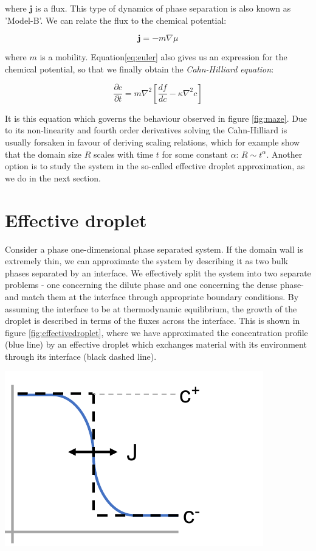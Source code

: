 \documentclass{Dissertate}
\let\origfigure\figure
\let\endorigfigure\endfigure
\renewenvironment{figure}[1][2] {
    \expandafter\origfigure\expandafter[H]
} {
    \endorigfigure
}
\begin{document}
where \(\mathbf{j}\) is a flux. This type of dynamics of phase separation is also known as 'Model-B'. We can relate the flux to the chemical
potential:

\[
\mathbf{j} = -m \nabla \mu
\]

where \(m\) is a mobility. Equation\ref{eq:euler} also gives us an expression for the chemical potential, so that we finally obtain the \emph{Cahn-Hilliard equation}:

\[
\frac{\partial c}{\partial t}=m\nabla^2[\frac{df}{dc}-\kappa\nabla^2c]
\]

It is this equation which governs the behaviour observed in figure
\ref{fig:maze}. Due to its non-linearity and fourth order
derivatives solving the Cahn-Hilliard is usually forsaken in
favour of deriving scaling relations, which for example show that the domain size $R$ scales with time $t$ for some constant $\alpha$: $R \sim t^{\alpha}$. Another option is to study the system in the so-called effective droplet approximation, as we do in the next section.

\hypertarget{effective-droplet}{%
\section{Effective droplet}\label{effective-droplet}}

Consider a phase one-dimensional phase separated system. If the domain wall is extremely thin, we can approximate the system by describing it as two bulk phases separated by an interface. We effectively split the system into two separate problems - one concerning the dilute phase and one concerning the dense phase- and match them at the interface through appropriate boundary conditions. By assuming the interface to be at thermodynamic equilibrium, the growth of the droplet is described in terms of the fluxes across the interface. This is shown in figure \ref{fig:effectivedroplet}, where we have approximated the concentration profile (blue line) by an effective droplet which exchanges material with its environment through its interface (black dashed line).

\begin{figure}
\hypertarget{fig:effectivedroplet}{%
\centering
\includegraphics{source/figures/pdf/effectivedroplet.pdf}
\caption{Model of an effective droplet. Blue line is full Cahn-Hilliard model,
black dashed line effective droplet.}\label{fig:effectivedroplet}
}
\end{figure}
\end{document}
